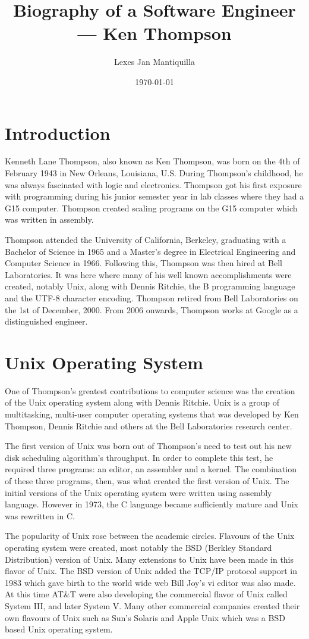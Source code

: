 \documentclass{article}
\title{Biography of a Software Engineer --- Ken Thompson}
\author{Lexes Jan Mantiquilla}
\date{\today}
\begin{document}
\maketitle

\section{Introduction}
Kenneth Lane Thompson, also known as Ken Thompson, was born on the 4th of
February 1943 in New Orleans, Louisiana, U.S. During Thompson's childhood, he
was always fascinated with logic and electronics. Thompson got his first
exposure with programming during his junior semester year in lab classes
where they had a G15 computer. Thompson created scaling programs on the G15
computer which was written in assembly.\cite{seibel2009coders}

Thompson attended the University of California, Berkeley, graduating with a
Bachelor of Science in 1965 and a Master's degree in Electrical Engineering and
Computer Science in 1966. Following this, Thompson was then hired at Bell
Laboratories. It was here where many of his well known accomplishments were
created, notably Unix, along with Dennis Ritchie, the B programming language
and the UTF-8 character encoding. Thompson retired from Bell Laboratories on
the 1st of December, 2000.\cite{linfo} From 2006 onwards, Thompson works at
Google as a distinguished engineer.

\section{Unix Operating System}
One of Thompson's greatest contributions to computer science was the creation
of the Unix operating system along with Dennis Ritchie. Unix is a group of
multitasking, multi-user computer operating systems that was developed by Ken
Thompson, Dennis Ritchie and others at the Bell Laboratories research center.

The first version of Unix was born out of Thompson's need to test out his new
disk scheduling algorithm's throughput. In order to complete this test, he
required three programs: an editor, an assembler and a kernel. The combination
of these three programs, then, was what created the first version of
Unix.\cite{VCF} The initial versions of the Unix operating system were written
using assembly language. However in 1973, the C language became sufficiently
mature and Unix was rewritten in C.\cite{ritchie1979evolution}

The popularity of Unix rose between the academic circles. Flavours of the Unix
operating system were created, most notably the BSD (Berkley Standard
Distribution) version of Unix. Many extensions to Unix have been made in this
flavor of Unix. The BSD version of Unix added the TCP/IP protocol support in
1983\cite{unixorg} which gave birth to the world wide web Bill Joy's vi editor
was also made. At this time AT\&T were also developing the commercial flavor of
Unix called System III, and later System V. Many other commercial companies
created their own flavours of Unix such as Sun's Solaris and Apple Unix which
was a BSD based Unix operating system.
\end{document}
